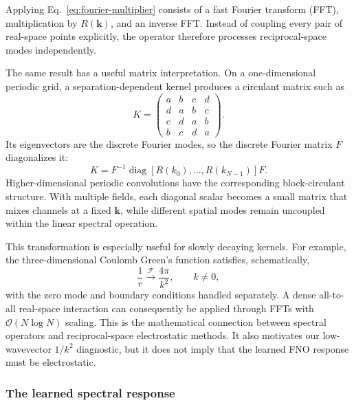 \documentclass[11pt]{article}
\begin{document}
Applying Eq.~\eqref{eq:fourier-multiplier} consists of a fast Fourier
transform (FFT), multiplication by \(R(\mathbf k)\), and an inverse FFT.
Instead of coupling every pair of real-space points explicitly, the operator
therefore processes reciprocal-space modes independently.

The same result has a useful matrix interpretation. On a one-dimensional
periodic grid, a separation-dependent kernel produces a circulant matrix such
as
\begin{equation}
 K=
 \begin{pmatrix}
  a&b&c&d\\
  d&a&b&c\\
  c&d&a&b\\
  b&c&d&a
 \end{pmatrix}.
 \label{eq:circulant-matrix}
\end{equation}
Its eigenvectors are the discrete Fourier modes, so the discrete Fourier
matrix \(F\) diagonalizes it:
\begin{equation}
 K=F^{-1}\operatorname{diag}\!\left[R(k_0),\ldots,R(k_{N-1})\right]F.
 \label{eq:circulant-diagonalization}
\end{equation}
Higher-dimensional periodic convolutions have the corresponding
block-circulant structure. With multiple fields, each diagonal scalar becomes
a small matrix that mixes channels at a fixed \(\mathbf k\), while different
spatial modes remain uncoupled within the linear spectral operation.

This transformation is especially useful for slowly decaying kernels. For
example, the three-dimensional Coulomb Green's function satisfies,
schematically,
\begin{equation}
 \frac{1}{r}\xrightarrow{\mathcal F}\frac{4\pi}{k^2},\qquad k\ne0,
 \label{eq:coulomb-fourier}
\end{equation}
with the zero mode and boundary conditions handled separately. A dense
all-to-all real-space interaction can consequently be applied through FFTs
with \(\mathcal O(N\log N)\) scaling. This is the mathematical connection
between spectral operators and reciprocal-space electrostatic methods. It
also motivates our low-wavevector \(1/k^2\) diagnostic, but it does not imply
that the learned FNO response must be electrostatic.

\subsubsection{The learned spectral response}
\end{document}
